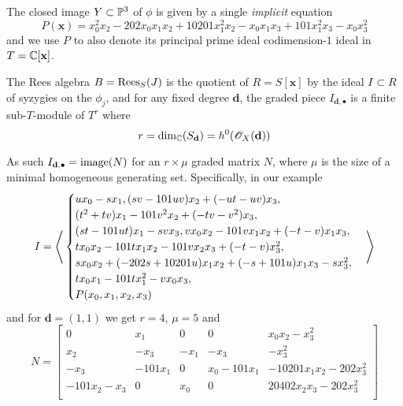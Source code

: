 \documentclass[fleqn,reqno]{amsart}
\numberwithin{first}{chapter}
\begin{document}
\begin{example}[$\mt{ex203}$]
The closed image $Y\subset\mathbb{P}^3$ of $\phi$ is given by a single {\em implicit} equation
\[
	P(\mathbf x)={x}_{0}^{2} {x}_{2}-202 {x}_{0} {x}_{1} {x}_{2}+10201
  {x}_{1}^{2} {x}_{2}-{x}_{0} {x}_{1} {x}_{3}+101 {x}_{1}^{2} {x}_{3}-{x}_{0}
  {x}_{3}^{2}
\]
and we use $P$ to also denote its principal prime ideal codimension-$1$ ideal in $T=\mathbb{C}[\mathbf x]$.

The Rees algebra $B=\operatorname{Rees}_S(J)$ is the quotient of $R=S[\mathbf x]$ by the ideal $I\subset R$
of syzygies on the $\phi_j$,
and for any fixed degree $\mathbf d$,
the graded piece $I_{\mathbf d,\bullet}$ is a finite sub-$T$-module of $T^r$ where
\[
	r=\dim_{\mathbb{C}}(S_{\mathbf d})=h^0(\mathscr{O}_X(\mathbf d))
\]

As such $I_{\mathbf d,\bullet}=\operatorname{image}(N)$ for an $r\times\mu$ graded matrix $N$, where $\mu$
is the size of a minimal homogeneous generating set. Specifically, in our example
\[
	I=\Bigg\langle
	\begin{cases}
	u {x}_{0}-s {x}_{1},
	(s v-101 u v) {x}_{2}+(-u t-u v){x}_{3},\\
	(t^{2}+t v) {x}_{1}-101 v^{2} {x}_{2}+(-t v-v^{2}) {x}_{3},\\
	(s t-101 ut) {x}_{1}-s v {x}_{3},v {x}_{0} {x}_{2}-101 v {x}_{1} {x}_{2}+(-t-v) {x}_{1}{x}_{3},\\
  	t {x}_{0} {x}_{2}-101 t {x}_{1} {x}_{2}-101 v {x}_{2} {x}_{3}+(-t-v){x}_{3}^{2},\\
  	s {x}_{0} {x}_{2}+(-202 s+10201 u) {x}_{1} {x}_{2}+(-s+101 u){x}_{1} {x}_{3}-s {x}_{3}^{2},\\
	t {x}_{0} {x}_{1}-101 t {x}_{1}^{2}-v {x}_{0}{x}_{3},\\P(x_0,x_1,x_2,x_3)
	\end{cases}\Bigg\rangle
\]
and for $\mathbf d=(1,1)$ we get $r=4$, $\mu=5$ and 
\[
	N=\begin{bmatrix}0&
	       {x}_{1}&
	       0&
	       0&
	       {x}_{0} {x}_{2}-{x}_{3}^{2}\\
	       {x}_{2}&
	       {-{x}_{3}}&
	       {-{x}_{1}}&
	       {-{x}_{3}}&
	       {-{x}_{3}^{2}}\\
	       {-{x}_{3}}&
	       {-101 {x}_{1}}&
	       0&
	       {x}_{0}-101 {x}_{1}&
	       -10201 {x}_{1} {x}_{2}-202 {x}_{3}^{2}\\
	       -101 {x}_{2}-{x}_{3}&
	       0&
	       {x}_{0}&
	       0&
	       20402 {x}_{2} {x}_{3}-202 {x}_{3}^{2}\\
	       \end{bmatrix}
\]


\end{example}
\end{document}
